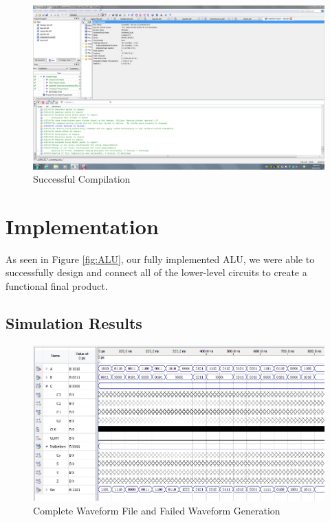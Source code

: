 \documentclass[a4paper,12pt]{article}
\begin{document}
\begin{figure}[H]
\includegraphics[width=\textwidth]{Diagrams/Diagnostics_CompilationReport.PNG} 
\caption{Successful Compilation}
\label{fig:compile}
\end{figure}

\newpage
\section{Implementation}

As seen in Figure \ref{fig:ALU}, our fully implemented ALU, we were able to successfully design and connect all of the lower-level circuits to create a functional final product.

\subsection{Simulation Results}

\begin{figure}[H]
\includegraphics[width=\textwidth]{Diagrams/WaveFormSimFinalFailed.PNG} 
\caption{Complete Waveform File and Failed Waveform Generation}
\label{fig:wav2}
\end{figure}
\end{document}
